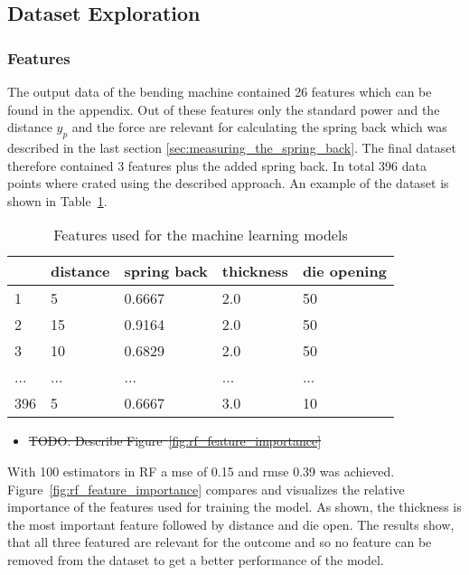 \label{sec:dataset_exploration}
\subsection{Dataset Exploration}
\subsubsection{Features}
The output data of the bending machine contained 26 features which can be found in the appendix. Out of these features only the standard power and the distance $y_p$ and the force are relevant for calculating the spring back which was described in the last section \ref{sec:measuring_the_spring_back}.
The final dataset therefore contained 3 features plus the added spring back.
In total 396 data points where crated using the described approach.
An example of the dataset is shown in Table~\ref{tab:dataset_example}.

\begin{table}[H]
    \centering
    \begin{tabular}{|l|l|l|l|l|}
        \hline
        \textbf{} & \textbf{distance} & \textbf{spring back} & \textbf{thickness} & \textbf{die opening} \\ \hline
        1         & 5                 & 0.6667               & 2.0                & 50                   \\
        2         & 15                & 0.9164               & 2.0                & 50                   \\
        3         & 10                & 0.6829               & 2.0                & 50                   \\
        ...       & ...               & ...                  & ...                & ...                  \\
        396       & 5                 & 0.6667               & 3.0                & 10                   \\
        \hline
    \end{tabular}
    \caption{Features used for the machine learning models}
    \label{tab:dataset_example}
\end{table}

\begin{itemize}
    \item \sout{TODO: Describe Figure~\ref{fig:rf_feature_importance}}
\end{itemize}

With 100 estimators in \ac{RF} a \ac{mse} of 0.15 and \ac{rmse} 0.39 was achieved.
Figure~\ref{fig:rf_feature_importance} compares and visualizes the relative importance of the features used for training the model.
As shown, the thickness is the most important feature followed by distance and die open. The results show, that all three featured are relevant for the outcome and so no feature can be removed from the dataset to get a better performance of the model.


